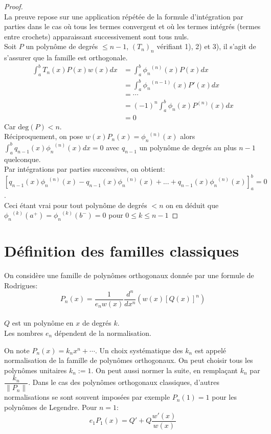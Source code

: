 \begin{proof}
$ $\\
La preuve repose sur une application répétée de la formule d'intégration par parties dans le cas où tous les termes convergent et où les termes intégrés (termes entre crochets) apparaissant successivement sont tous nuls.
\\Soit $P$ un polynôme de degrés $\leqslant n-1$, $(T_n)_n$ vérifiant 1), 2) et 3), il s'agit de s'assurer que la famille est orthogonale.
\begin{align*}
\int_{a}^{b}T_n(x)P(x)w(x)dx & = \int_{a}^{b}{\phi_n}^{(n)}(x)P(x)dx\\
& = \int_{a}^{b}{\phi_n}^{(n-1)}(x)P'(x)dx\\
& =\cdots\\
& = (-1)^{n}\int_{a}^{b}\phi_n(x)P^{(n)}(x)dx\\
& = 0
\end{align*}
Car $\text{deg}(P)<n$.
\\Réciproquement, on pose $w(x)P_{n}(x)={\phi_{n}}^{(n)}(x)$ alors $\displaystyle{\int_{a}^{b}q_{n-1}(x){\phi_{n}}^{(n)}(x)dx = 0}$ avec $q_{n-1}$ un polynôme de degrés au plus $n-1$ quelconque.
\\Par intégrations par parties successives, on obtient:
\\$\left[q_{n-1}(x){\phi_{n}}^{(n)}(x) - q_{n-1}(x){\phi_{n}}^{(n)}(x) +...+ q_{n-1}(x){\phi_{n}}^{(n)}(x)\right]_a^b = 0$.
\\Ceci étant vrai pour tout polynôme de degrés $< n$ on en déduit que $ {\phi_n}^{(k)} (a^+) = {\phi_n}^{(k)} (b^-) = 0$ pour $ 0 \leqslant k \leqslant n-1$
\end{proof}

\section{Définition des familles classiques}
On considère une famille de polynômes orthogonaux donnée par une formule de Rodrigues: \[P_n(x)=\frac{1}{e_n w(x)} \frac{d^n}{dx^n}(w(x) [Q(x)]^n)\]
\\$Q$ est un polynôme en $x$ de degrés $k$.
\\Les nombres $e_n$ dépendent de la normalisation.
 
\brmq
$ $\\On note $P_n(x)=k_{n}x^{n} + \cdots$. Un choix systématique des $k_{n}$ est appelé normalisation de la famille de polynômes orthogonaux. On peut choisir tous les polynômes unitaires $k_{n}:=1$. On peut aussi normer la suite, en remplaçant $k_{n}$ par $ \dfrac{k_{n}}{\|P_{n}\|}$. Dans le cas des polynômes orthogonaux classiques, d'autres normalisations se sont souvent imposées par exemple $P_{n}(1)=1$ pour les polynômes de Legendre. 
\ermq
Pour $n=1$:
$$e_{1}P_{1}(x)= Q'+Q\dfrac{w'(x)}{w(x)}$$

